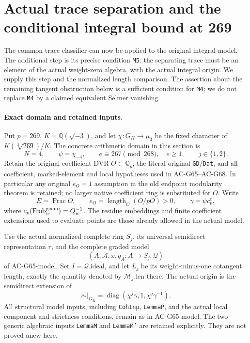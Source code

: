 \section{Actual trace separation and the conditional integral bound at 269}
\label{sec:cubic-model-trace-separation-bound}

The common trace classifier can now be applied to the original integral
model.  The additional step is its precise condition \texttt{M5}:
the separating trace must be an element of the actual weight-zero
algebra, with the actual integral origin.  We supply this step and
the normalized length comparison.  The assertion about the remaining
tangent obstruction below is a sufficient condition for \texttt{M4};
we do not replace \texttt{M4} by a claimed equivalent Selmer vanishing.

\paragraph{Exact domain and retained inputs.}
Put \(p=269\), \(K=\mathbb Q(\sqrt{-3})\), and let
\(\chi:G_K\to\mu_3\) be the fixed character of
\(K(\sqrt[3]{269})/K\).  The concrete arithmetic domain in this
section is
\[
 N=4,\qquad \psi=\chi_{-4},\qquad
 e\equiv267\pmod{268},\quad e\ge1,\qquad j\in\{1,2\}.
 \tag{G113.1}
\]
Retain the original coefficient DVR \(O\subset\overline{\mathbb Q}_p\),
the literal original \texttt{GD}/\texttt{Dat}, and all coefficient,
marked-element and local hypotheses used in AC-G65--AC-G68.  In
particular any original \(e_O=1\) assumption in the old endpoint
modularity theorem is retained; no larger native coefficient ring is
substituted for \(O\).  Write
\[
 E=\operatorname{Frac}O,\qquad
 e_O=\operatorname{length}_O(O/pO)>0,\qquad
 \gamma=\psi c_p^e,
 \tag{G113.2}
\]
where \(c_p(\mathrm{Frob}^{\rm geom}_w)=Q_w^{-1}\).
The residue embeddings and finite coefficient extensions used to
evaluate points are those already allowed in the actual model.

Use the actual normalized complete ring \(S_j\), its universal
semidirect representation \(r\), and the complete graded model
\[
       (A,\mathcal A,x,q_A:A\longrightarrow S_j,\mathcal Q)
 \tag{G113.3}
\]
of AC-G65-model.  Set \(I=\mathcal Q.\mathrm{ideal}\), and let
\(L_j\) be its weight-minus-one cotangent length, exactly the
quantity denoted by \(\mathcal M_j.\mathrm{len}\) there.
The actual origin is the semidirect extension of
\[
 r_*|_{G_K}=\operatorname{diag}
       (\chi^j\gamma,1,\chi^j\gamma^{-1}).
 \tag{G113.4}
\]
All structural model inputs, including \texttt{CohInp},
\texttt{LemmaP}, and the actual local component and strictness
conditions, remain as in AC-G65-model.  The two generic algebraic
inputs \texttt{LemmaM} and \texttt{LemmaM'} are retained explicitly.
They are not proved anew here.

